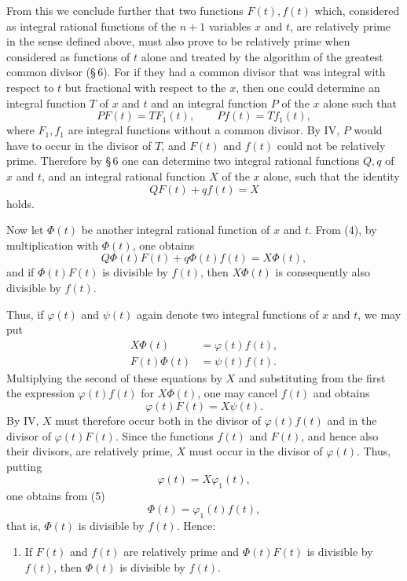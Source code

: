 \documentclass[11pt]{article}
\begin{document}
From this we conclude further that two functions $F(t),f(t)$ which, considered as integral rational functions of the $n+1$ variables $x$ and $t$, are relatively prime in the sense defined above, must also prove to be relatively prime when considered as functions of $t$ alone and treated by the algorithm of the greatest common divisor (\S\,6). For if they had a common divisor that was integral with respect to $t$ but fractional with respect to the $x$, then one could determine an integral function $T$ of $x$ and $t$ and an integral function $P$ of the $x$ alone such that
\[
PF(t)=TF_1(t),
\qquad
Pf(t)=Tf_1(t),
\]
where $F_1,f_1$ are integral functions without a common divisor. By IV, $P$ would have to occur in the divisor of $T$, and $F(t)$ and $f(t)$ could not be relatively prime. Therefore by \S\,6 one can determine two integral rational functions $Q,q$ of $x$ and $t$, and an integral rational function $X$ of the $x$ alone, such that the identity
\begin{equation}
QF(t)+qf(t)=X
\tag{4}
\end{equation}
holds.

Now let $\Phi(t)$ be another integral rational function of $x$ and $t$. From (4), by multiplication with $\Phi(t)$, one obtains
\[
Q\Phi(t)F(t)+q\Phi(t)f(t)=X\Phi(t),
\]
and if $\Phi(t)F(t)$ is divisible by $f(t)$, then $X\Phi(t)$ is consequently also divisible by $f(t)$.

Thus, if $\varphi(t)$ and $\psi(t)$ again denote two integral functions of $x$ and $t$, we may put
\begin{equation}
\begin{aligned}
X\Phi(t)&=\varphi(t)f(t),\\
F(t)\Phi(t)&=\psi(t)f(t).
\end{aligned}
\tag{5}
\end{equation}
Multiplying the second of these equations by $X$ and substituting from the first the expression $\varphi(t)f(t)$ for $X\Phi(t)$, one may cancel $f(t)$ and obtains
\[
\varphi(t)F(t)=X\psi(t).
\]
By IV, $X$ must therefore occur both in the divisor of $\varphi(t)f(t)$ and in the divisor of $\varphi(t)F(t)$. Since the functions $f(t)$ and $F(t)$, and hence also their divisors, are relatively prime, $X$ must occur in the divisor of $\varphi(t)$. Thus, putting
\[
\varphi(t)=X\varphi_1(t),
\]
one obtains from (5)
\[
\Phi(t)=\varphi_1(t)f(t),
\]
that is, $\Phi(t)$ is divisible by $f(t)$. Hence:

\begin{enumerate}[label=\Roman*.,leftmargin=2.4em,start=7]
\item If $F(t)$ and $f(t)$ are relatively prime and $\Phi(t)F(t)$ is divisible by $f(t)$, then $\Phi(t)$ is divisible by $f(t)$.
\end{enumerate}
\end{document}
